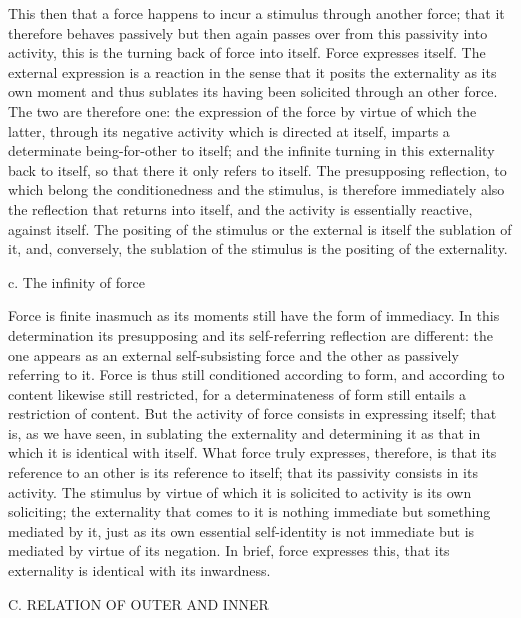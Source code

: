 This then that a force happens to incur
a stimulus through another force;
that it therefore behaves passively
but then again passes over from
this passivity into activity,
this is the turning back of force into itself.
Force expresses itself.
The external expression is a reaction
in the sense that it posits
the externality as its own moment
and thus sublates its having been
solicited through an other force.
The two are therefore one:
the expression of the force
by virtue of which the latter,
through its negative activity
which is directed at itself,
imparts a determinate being-for-other to itself;
and the infinite turning in
this externality back to itself,
so that there it only refers to itself.
The presupposing reflection,
to which belong the conditionedness and the stimulus,
is therefore immediately also the reflection
that returns into itself,
and the activity is essentially reactive,
against itself.
The positing of the stimulus
or the external is itself
the sublation of it,
and, conversely, the sublation of the stimulus is
the positing of the externality.

c. The infinity of force

Force is finite inasmuch as its moments
still have the form of immediacy.
In this determination its presupposing
and its self-referring reflection are different:
the one appears as an external self-subsisting force
and the other as passively referring to it.
Force is thus still conditioned according to form,
and according to content likewise still restricted,
for a determinateness of form still entails a restriction of content.
But the activity of force consists in expressing itself;
that is, as we have seen, in sublating the externality and
determining it as that in which
it is identical with itself.
What force truly expresses, therefore,
is that its reference to an other
is its reference to itself;
that its passivity consists in its activity.
The stimulus by virtue of which
it is solicited to activity is its own soliciting;
the externality that comes to it is nothing immediate
but something mediated by it,
just as its own essential
self-identity is not immediate
but is mediated by virtue of its negation.
In brief, force expresses this,
that its externality is identical with its inwardness.

C. RELATION OF OUTER AND INNER

